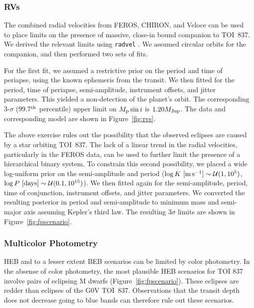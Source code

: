 \documentclass[12pt,twocolumn,tighten]{aastex63}
\newcommand{\tn}{TOI~837} %
\begin{document}
\subsubsection{RVs}
The combined radial velocities from FEROS, CHIRON, and Veloce can be
used to place limits on the presence of massive, close-in bound
companion to \tn.  We derived the relevant limits using
\texttt{radvel} \citep{fulton_radvel_2018}.  We assumed circular
orbits for the companion, and then performed two sets of fits.

For the first fit, we assumed a restrictive prior on the period and
time of periapse, using the known ephemeris from the transit.  We then
fitted for the period, time of periapse, semi-amplitude, instrument
offsets, and jitter parameters.  This yielded a non-detection of the
planet's orbit.  The corresponding 3-$\sigma$ (99.7$^{\rm th}$
percentile) upper limit on $M_{\rm p} \sin i$ is $1.20 M_{\rm Jup}$.
The data and corresponding model are shown in Figure~\ref{fig:rvs}.

The above exercise rules out the possibility that the observed
eclipses are caused by a star orbiting \tn.  The lack of a linear
trend in the radial velocities, particularly in the FEROS data, can be
used to further limit the presence of a hierarchical binary system.
To constrain this second possibility, we placed a wide log-uniform
prior on the semi-amplitude and period ($\log K\ [{\rm m\,s^{-1}}]
\sim \mathcal{U}(1,10^5)$, $\log P\ [{\rm days}] \sim \mathcal{U}(0.1,
10^{15})$).  We then fitted again for the semi-amplitude, period, time
of conjunction, instrument offsets, and jitter parameters.  We
converted the resulting posterior in period and semi-amplitude to
minimum mass and semi-major axis assuming Kepler's third law.  The
resulting $3\sigma$ limits are shown in Figure~\ref{fig:fpscenario}.

\subsubsection{Multicolor Photometry}

HEB and to a lesser extent BEB scenarios can be limited
by color photometry.
In the absense of color photometry, the most plausible HEB scenarios for TOI
837 involve pairs of eclipsing M dwarfs (Figure~\ref{fig:fpscenario}).
These eclipses are redder than eclipses of the G0V \tn.
Observations that the transit depth does not decrease
going to blue bands can therefore rule out these scenarios.
\end{document}
